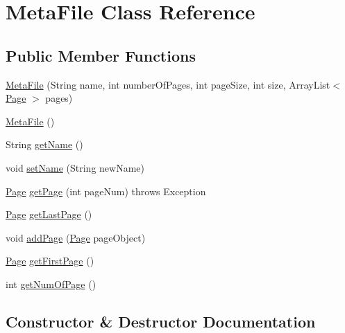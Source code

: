 \hypertarget{class_meta_file}{}\section{Meta\+File Class Reference}
\label{class_meta_file}
\subsection*{Public Member Functions}
\begin{DoxyCompactItemize}
\item 
\mbox{\hyperlink{class_meta_file_aa0e71eb6d56f1e50c2cf53c321a7b4c0}{Meta\+File}} (String name, int number\+Of\+Pages, int page\+Size, int size, Array\+List$<$ \mbox{\hyperlink{class_page}{Page}} $>$ pages)
\item 
\mbox{\hyperlink{class_meta_file_a66c83b5972fe6b3baf1d5f3e79790890}{Meta\+File}} ()
\item 
String \mbox{\hyperlink{class_meta_file_a7704cca7da5d2e765d70d01562d6f4da}{get\+Name}} ()
\item 
void \mbox{\hyperlink{class_meta_file_ac4abf81a1fb0c5478b13527091345ed5}{set\+Name}} (String new\+Name)
\item 
\mbox{\hyperlink{class_page}{Page}} \mbox{\hyperlink{class_meta_file_a28c7cbf3f8889b484df5b11b99825a4e}{get\+Page}} (int page\+Num)  throws Exception 	
\item 
\mbox{\hyperlink{class_page}{Page}} \mbox{\hyperlink{class_meta_file_adf3ad8347572a056d3a7ae730c120303}{get\+Last\+Page}} ()
\item 
void \mbox{\hyperlink{class_meta_file_a5244a5a75cdf85974ae9cb94b5490a21}{add\+Page}} (\mbox{\hyperlink{class_page}{Page}} page\+Object)
\item 
\mbox{\hyperlink{class_page}{Page}} \mbox{\hyperlink{class_meta_file_a495f8b327a312ebcdd54e7dbfdd98ee5}{get\+First\+Page}} ()
\item 
int \mbox{\hyperlink{class_meta_file_a05c2f305a2e388e3482962321ff7ba7e}{get\+Num\+Of\+Page}} ()
\end{DoxyCompactItemize}


\subsection{Constructor \& Destructor Documentation}
\mbox{\label{class_meta_file_aa0e71eb6d56f1e50c2cf53c321a7b4c0}} 
